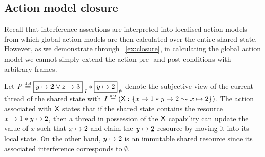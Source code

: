 \subsection{Action model closure}
\label{subsec:amodClosure}

Recall that interference assertions are interpreted into localised action models from which global action models are then calculated over the entire shared state. However, as we demonstrate through \ex~\ref{ex:closure}, in calculating the global action model we cannot simply extend the action pre- and post-conditions with arbitrary frames. 
\begin{example}[]\label{ex:closure}
Let $P \eqdef \shared{\cell{y}{2} \lor \cell{z}{3}}{I} * \shared{\cell{y}{2}}{\emptyset}$ denote the subjective view of the current thread of the shared state with $I \mathrel{\stackrel{\smash{\scriptscriptstyle{\mathrm{def}}}}{=}} (\mathsf{X}: \left\{x \mapsto 1 * y \mapsto 2 \mathrel{\leadsto} x \mapsto 2\right\})$. The action associated with $\mathsf{X}$ states that if the shared state contains the resource $x \mapsto 1 * y \mapsto 2$, then a thread in possession of the $\mathsf{X}$ capability can update the value of $x$ such that $x \mapsto 2$ and claim the $y \mapsto 2$ resource by moving it into its local state. On the other hand, $y \mapsto 2$ is an immutable shared resource since its associated interference corresponds to $\emptyset$.


\end{example}

